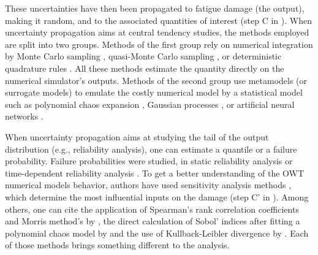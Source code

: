 These uncertainties have then been propagated to fatigue damage (the output), making it random, and to the associated quantities of interest (step C in ). 
When uncertainty propagation aims at central tendency studies, the methods employed are split into two groups. 
Methods of the first group rely on numerical integration by Monte Carlo sampling \citep{graf_2016}, quasi-Monte Carlo sampling \citep{muller_cheng_2018}, or deterministic quadrature rules \citep{bos_2020}. 
All these methods estimate the quantity directly on the numerical simulator's outputs. 
Methods of the second group use metamodels (or surrogate models) to emulate the costly numerical model by a statistical model such as polynomial chaos expansion \citep{dimitrov_kelly_2018, murcia_dimitrov_2018}, Gaussian processes \citep{huchet_2019,slot_sorensen_2020,wilkie_galasso_2021}, or artificial neural networks \citep{aoues_2023}. 

When uncertainty propagation aims at studying the tail of the output distribution (e.g., reliability analysis), one can estimate a quantile or a failure probability. 
Failure probabilities were studied, in static reliability analysis \citep{zwick_muskulus_2015,slot_sorensen_2020,wilkie_galasso_2021} or time-dependent reliability analysis \citep{abdallah_lataniotis_2017,lataniotis_2019}. 
To get a better understanding of the OWT numerical models behavior, authors have used sensitivity analysis methods \citep{daveiga_iooss_2021}, which determine the most influential inputs on the damage (step C' in ). 
Among others, one can cite the application of Spearman's rank correlation coefficients and Morris method's by \cite{verlade_kramhoft_2019,petrovska_2022}, the direct calculation of Sobol' indices after fitting a polynomial chaos model by \cite{murcia_dimitrov_2018} and the use of Kullback-Leibler divergence by \cite{teixeira_oconnor_2017}. 
Each of those methods brings something different to the analysis.

